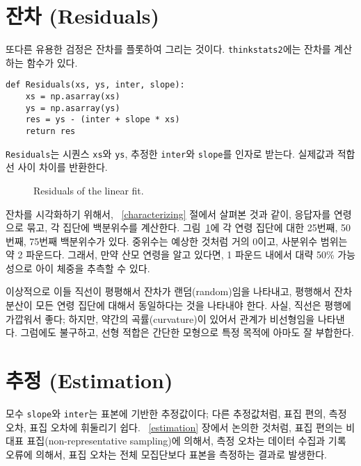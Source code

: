 \section{잔차 (Residuals)}
\label{residuals}

또다른 유용한 검정은 잔차를 플롯하여 그리는 것이다.
{\tt thinkstats2}에는 잔차를 계산하는 함수가 있다.

\begin{verbatim}
def Residuals(xs, ys, inter, slope):
    xs = np.asarray(xs)
    ys = np.asarray(ys)
    res = ys - (inter + slope * xs)
    return res
\end{verbatim}

{\tt Residuals}는 시퀀스 {\tt xs}와 {\tt ys}, 추정한 {\tt inter}와 {\tt slope}를 인자로 받는다. 실제값과 적합선 사이 차이를 반환한다.

\begin{figure}
\caption{Residuals of the linear fit.}
\label{linear2}
\end{figure}

잔차를 시각화하기 위해서, ~\ref{characterizing} 절에서 살펴본 것과 같이, 응답자를 연령으로 묶고, 각 집단에 백분위수를 계산한다. 
그림~\ref{linear2}에 각 연령 집단에 대한 25번째, 50번째, 75번째 백분위수가 있다.
중위수는 예상한 것처럼 거의 0이고, 사분위수 범위는 약 2 파운드다. 그래서, 만약 산모 연령을 알고 있다면, 1 파운드 내에서 대략 50\% 가능성으로 아이 체중을 추측할 수 있다.

이상적으로 이들 직선이 평평해서 잔차가 랜덤(random)임을 나타내고, 
평행해서 잔차 분산이 모든 연령 집단에 대해서 동일하다는 것을 나타내야 한다.
사실, 직선은 평행에 가깝워서 좋다; 하지만, 약간의 곡률(curvature)이 있어서 관계가 비선형임을 나타낸다.
그럼에도 불구하고, 선형 적합은 간단한 모형으로 특정 목적에 아마도 잘 부합한다.  



\section{추정 (Estimation)}
\label{regest}

모수 {\tt slope}와 {\tt inter}는 표본에 기반한 추정값이다; 다른 추정값처럼, 표집 편의, 측정 오차, 표집 오차에 휘둘리기 쉽다. 
~\ref{estimation} 장에서 논의한 것처럼, 표집 편의는 비대표 표집(non-representative sampling)에 의해서, 측정 오차는 데이터 수집과 기록 오류에 의해서, 표집 오차는 전체 모집단보다 표본을 측정하는 결과로 발생한다.

